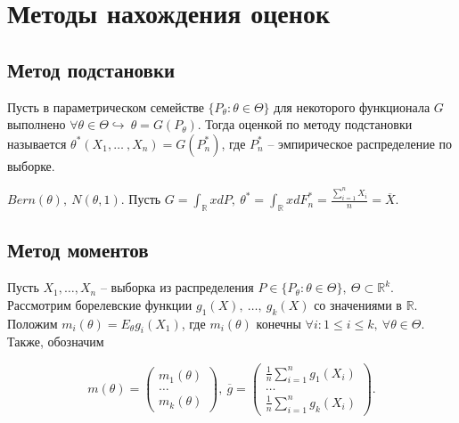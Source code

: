 \section{Методы нахождения оценок}
\subsection{Метод подстановки}
\begin{definition}
Пусть в параметрическом семействе $\displaystyle \{P_{\theta } :\theta \in \Theta \}$ для некоторого функционала $\displaystyle G$ выполнено $\displaystyle \forall \theta \in \Theta \hookrightarrow \ \theta =G( P_{\theta })$. Тогда оценкой по методу подстановки называется $\displaystyle \theta ^{*}( X_{1},\dotsc\ ,X_{n}) =G\left( P_{n}^{*}\right)$, где $\displaystyle P_{n}^{*}$ -- эмпирическое распределение по выборке.
\end{definition}
\begin{example}
$\displaystyle Bern( \theta ),\ N( \theta ,1)$. Пусть $\displaystyle G=\int _{\mathbb{R}} xdP,\ \theta ^{*} =\int _{\mathbb{R}} xdF_{n}^{*} =\frac{\sum _{i=1}^{n} X_{i}}{n} =\overline{X}$.
\end{example}
\subsection{Метод моментов}

Пусть $\displaystyle X_{1} ,\dotsc ,X_{n}$ -- выборка из распределения $\displaystyle P\in \{P_{\theta } :\theta \in \Theta \},\ \Theta \subset \mathbb{R}^{k}$. Рассмотрим борелевские функции $\displaystyle g_{1}( X) ,\ \dotsc ,\ g_{k}( X)$ со значениями в $\displaystyle \mathbb{R}$. Положим $\displaystyle m_{i}( \theta ) =E_{\theta } g_{i}( X_{1})$, где $\displaystyle m_{i}( \theta )$ конечны $\displaystyle \forall i:1\leqslant i\leqslant k,\ \forall \theta \in \Theta $. Также, обозначим


\begin{equation*}
m( \theta ) =\begin{pmatrix}
m_{1}( \theta )\\
\dotsc \\
m_{k}( \theta )
\end{pmatrix} ,\ \overline{g} =\begin{pmatrix}
\frac{1}{n}\sum _{i=1}^{n} g_{1}( X_{i})\\
\dotsc \\
\frac{1}{n}\sum _{i=1}^{n} g_{k}( X_{i})
\end{pmatrix} .
\end{equation*}


